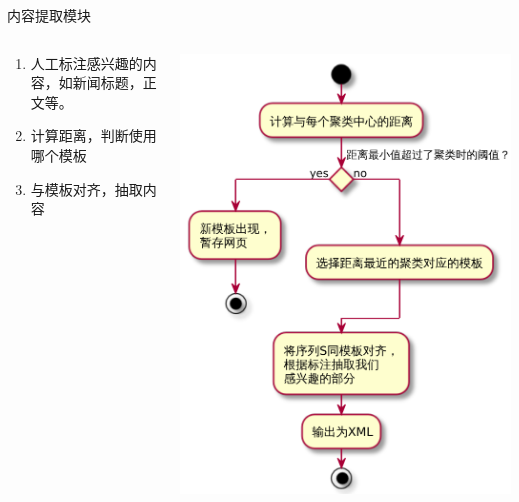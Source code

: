 \begin{frame}[label=sec-2-23]{内容提取模块}
  \begin{columns}
    \begin{column}{0.4\textwidth}
      \begin{enumerate}[<+->]
  \item 人工标注感兴趣的内容，如新闻标题，正文等。
  \item 计算距离，判断使用哪个模板
  \item 与模板对齐，抽取内容
  \end{enumerate}
    \end{column}
    \begin{column}{0.6\textwidth}
\centering
    \vspace{-1cm}
\includegraphics[width=\textwidth]{extractor}
    \end{column}
  \end{columns}
\end{frame}

